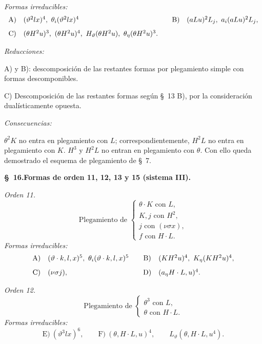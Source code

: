 \documentclass[11pt]{article}
\begin{document}
\noindent\emph{Formas irreducibles:}
\[
\begin{array}{c@{\quad}l@{\qquad}c@{\quad}l}
\text{A)}&(\vartheta^2lx)^4,
\ \theta_i(\vartheta^2lx)^4&
\text{B)}&(aLu)^2L_j,
\ a_i(aLu)^2L_j,\\[0.8em]
\text{C)}&(\theta H^2u)^3,
\ (\theta H^2u)^4,
\ H_\vartheta(\theta H^2u),
\ \theta_\eta(\theta H^2u)^3.
\end{array}
\]

\noindent\emph{Reducciones:}

A) y B): descomposición de las restantes formas por plegamiento simple con formas descomponibles.

C) Descomposición de las restantes formas según \S\ 13 B), por la consideración dualísticamente opuesta.

\noindent\emph{Consecuencias:}

$\theta^2K$ no entra en plegamiento con $L$; correspondientemente, $H^2L$ no entra en plegamiento con $K$. $H^3$ y $H^2L$ no entran en plegamiento con $\theta$. Con ello queda demostrado el esquema de plegamiento de \S\ 7.

\begin{center}
\textbf{\S\ 16.\quad Formas de orden 11, 12, 13 y 15 (sistema III).}
\end{center}

\noindent\emph{Orden 11.}
\[
\text{Plegamiento de }\left\{\begin{array}{l}
\theta\cdot K\text{ con }L,\\
K,j\text{ con }H^2,\\
j\text{ con }(\nu\sigma x),\\
f\text{ con }H\cdot L.
\end{array}\right.
\]
\noindent\emph{Formas irreducibles:}
\[
\begin{array}{c@{\quad}l@{\qquad}c@{\quad}l}
\text{A)}&(\vartheta\cdot k,l,x)^5,
\ \theta_i(\vartheta\cdot k,l,x)^5&
\text{B)}&(KH^2u)^4,
\ K_\eta(KH^2u)^4,\\[0.8em]
\text{C)}&(\nu\sigma j),&
\text{D)}&(a_\eta H\cdot L,u)^4.
\end{array}
\]

\noindent\emph{Orden 12.}
\[
\text{Plegamiento de }\left\{\begin{array}{l}
\theta^3\text{ con }L,\\
\theta\text{ con }H\cdot L.
\end{array}\right.
\]
\noindent\emph{Formas irreducibles:}
\[
\text{E)}\ (\vartheta^3lx)^6,
\qquad
\text{F)}\ (\theta,H\cdot L,u)^4,
\qquad L_\vartheta(\theta,H\cdot L,u^4).
\]
\end{document}
